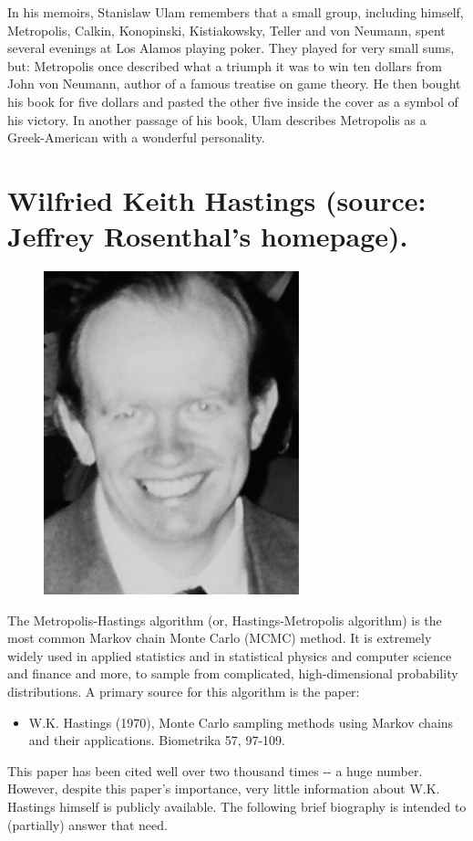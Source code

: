 \documentclass[english,graybox,envcountchap,envcountsame,sectrefs,shortlabels]{svmono}
\theoremstyle{style}
\begin{document}
\begin{subappendices}
In his memoirs, Stanislaw Ulam remembers that a small group, including
himself, Metropolis, Calkin, Konopinski, Kistiakowsky, Teller and
von Neumann, spent several evenings at Los Alamos playing poker. They
played for very small sums, but: \textquotedbl Metropolis once described
what a triumph it was to win ten dollars from John von Neumann, author
of a famous treatise on game theory. He then bought his book for five
dollars and pasted the other five inside the cover as a symbol of
his victory.\textquotedbl{} In another passage of his book, Ulam describes
Metropolis as \textquotedbl a Greek-American with a wonderful personality.\textquotedbl{}



\section{Wilfried Keith Hastings (source: Jeffrey Rosenthal's homepage).}

\begin{figure} \centering

\includegraphics[scale=0.3]{hastings}

\end{figure} The Metropolis-Hastings algorithm (or, Hastings-Metropolis
algorithm) is the most common Markov chain Monte Carlo (MCMC) method.
It is extremely widely used in applied statistics and in statistical
physics and computer science and finance and more, to sample from
complicated, high-dimensional probability distributions. A primary
source for this algorithm is the paper:
\begin{itemize}
\item W.K. Hastings (1970), Monte Carlo sampling methods using Markov chains
and their applications. Biometrika 57, 97-109.
\end{itemize}
This paper has been cited well over two thousand times -{}- a huge
number. However, despite this paper's importance, very little information
about W.K. Hastings himself is publicly available. The following brief
biography is intended to (partially) answer that need.


\end{subappendices}
\end{document}
